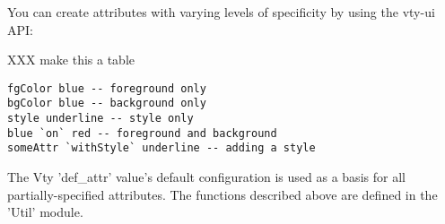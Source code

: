 You can create attributes with varying levels of specificity by using
the vty-ui API:

XXX make this a table
\begin{verbatim}
fgColor blue -- foreground only
bgColor blue -- background only
style underline -- style only
blue `on` red -- foreground and background
someAttr `withStyle` underline -- adding a style
\end{verbatim}

The Vty 'def\_attr' value's default configuration is used as a basis for
all partially-specified attributes.  The functions described above are
defined in the 'Util' module.
